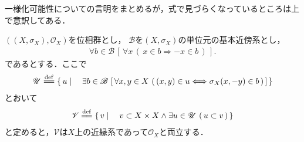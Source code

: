 	一様化可能性についての言明をまとめるが，式で見づらくなっているところは上で意訳してある．
	\begin{screen}
		\begin{thm}[位相群は一様化可能である]\label{thm:topological_groups_are_uniformazable}
			$\left(\left(X,\sigma_X\right),\mathscr{O}_X\right)$を位相群とし，
			$\mathscr{B}$を$\left(X,\sigma_X\right)$の単位元の基本近傍系とし，
			\begin{align}
				\forall b \in \mathscr{B}\, \left[\, \forall x\, (\, x \in b \Longrightarrow -x \in b\, )\, \right].
			\end{align}
			であるとする．ここで
			\begin{align}
				\mathscr{U} \defeq \Set{u}{\exists b \in \mathscr{B}\,
				\left[\, \forall x,y \in X\, \left(\, (x,y) \in u \Longleftrightarrow\sigma_X(x,-y) \in b\, \right)\, \right]}
			\end{align}
			とおいて
			\begin{align}
				\mathscr{V} \defeq \Set{v}{v \subset X \times X \wedge \exists u \in \mathscr{U}\, \left(\, u \subset v\, \right)}
			\end{align}
			と定めると，$\mathscr{V}$は$X$上の近縁系であって$\mathscr{O}_X$と両立する．
		\end{thm}
	\end{screen}
	
